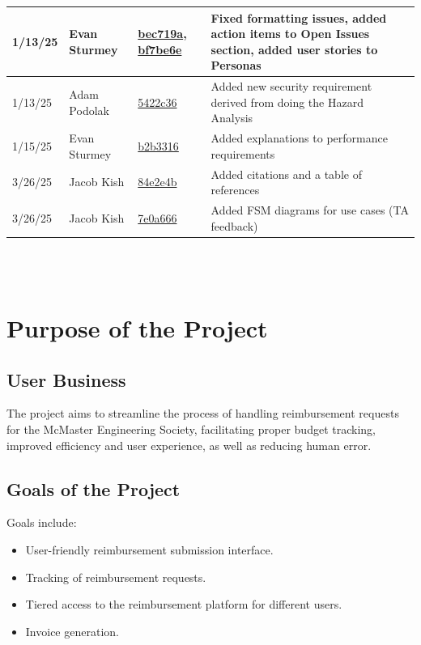 \documentclass[12pt]{article}
\begin{document}
\begin{table}[H]
\begin{tabularx}{\textwidth}{p{} p{} p{} p{}}
\midrule
1/13/25 & 
Evan Sturmey & 
\href{https://github.com/ausbennett/mes-finance-platform/commit/bec719a678c2e216e68564fe8e70e5d8c9853035}{bec719a},
\href{https://github.com/ausbennett/mes-finance-platform/commit/bf7be6e379e0efa3128f5f5989a94023b1278a87}{bf7be6e} & 
Fixed formatting issues, added action items to Open Issues section, added user stories to Personas\\

\midrule
1/13/25 & Adam Podolak & \href{https://github.com/ausbennett/mes-finance-platform/commit/5422c362a85ad7f0be7c1a9e8eb7d380189c7e6c}{5422c36} & Added new security requirement derived from doing the Hazard Analysis\\

\midrule
1/15/25 & Evan Sturmey & \href{https://github.com/ausbennett/mes-finance-platform/commit/b2b3316ca9404bea7e434619626dbc444267fc1a}{b2b3316} & Added explanations to performance requirements\\

\midrule
3/26/25 & Jacob Kish & \href{https://github.com/ausbennett/mes-finance-platform/commit/84e2e4b2016738b8f131e530a7b00ee1dce82a9c}{84e2e4b} & Added citations and a table of references\\

\midrule
3/26/25 & Jacob Kish & \href{https://github.com/ausbennett/mes-finance-platform/commit/7e0a66622fbd429784351f832cb660610bc7d28d}{7e0a666} & Added FSM diagrams for use cases (TA feedback)\\

\bottomrule
\end{tabularx}
\end{table}

~\\

~\newpage
\section{Purpose of the Project}
\subsection{User Business}
The project aims to streamline the process of handling reimbursement requests for the McMaster Engineering Society, facilitating proper budget tracking, improved efficiency and user experience, as well as reducing human error.

\subsection{Goals of the Project}
Goals include:
\begin{itemize}
    \item User-friendly reimbursement submission interface.
    \item Tracking of reimbursement requests.
    \item Tiered access to the reimbursement platform for different users.
    \item Invoice generation.
\end{itemize}
\end{document}
